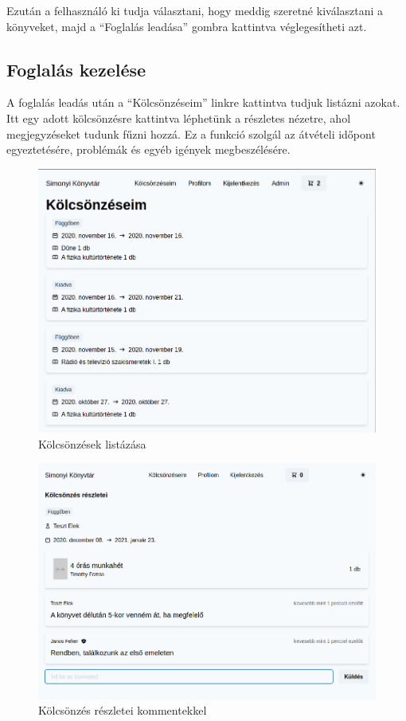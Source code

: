 Ezután a felhasználó ki tudja választani, hogy meddig szeretné kiválasztani a könyveket, majd a ``Foglalás leadása'' gombra kattintva
véglegesítheti azt.

\subsection{Foglalás kezelése}

A foglalás leadás után a ``Kölcsönzéseim'' linkre kattintva tudjuk listázni azokat. Itt egy adott kölcsönzésre kattintva
léphetünk a részletes nézetre, ahol megjegyzéseket tudunk fűzni hozzá. Ez a funkció szolgál az átvételi időpont egyeztetésére,
problémák és egyéb igények megbeszélésére.

\begin{figure}[!ht]
  \centering
  \includegraphics[width=150mm, keepaspectratio]{figures/orders-list.png}
  \caption{Kölcsönzések listázása}
  \label{fig:S3Console}
\end{figure}


\begin{figure}[!ht]
  \centering
  \includegraphics[width=150mm, keepaspectratio]{figures/order-detail.png}
  \caption{Kölcsönzés részletei kommentekkel}
  \label{fig:S3Console}
\end{figure}


